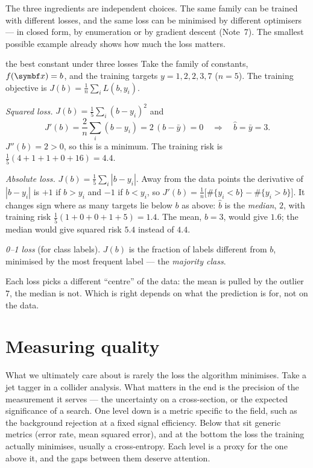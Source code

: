 \documentclass[11pt]{article}
\begin{document}
The three ingredients are independent choices. The same family can be trained with different losses, and the same
loss can be minimised by different optimisers --- in closed form, by enumeration or by gradient descent (Note~7).
The smallest possible example already shows how much the loss matters.

\begin{worked}{the best constant under three losses}
Take the family of constants, $f(\x) = b$, and the training targets $y = 1, 2, 2, 3, 7$ ($n = 5$). The training
objective is $J(b) = \frac1n \sum_i L(b, y_i)$.

\emph{Squared loss.} $J(b) = \frac15 \sum_i (b - y_i)^2$ and
\[
  J'(b) = \frac{2}{n} \sum_i (b - y_i) = 2\,(b - \bar y) = 0 \quad\Longrightarrow\quad \hat b = \bar y = 3 .
\]
$J''(b) = 2 > 0$, so this is a minimum. The training risk is
$\frac15(4 + 1 + 1 + 0 + 16) = 4.4$.

\emph{Absolute loss.} $J(b) = \frac15 \sum_i |b - y_i|$. Away from the data points the derivative of $|b - y_i|$ is
$+1$ if $b > y_i$ and $-1$ if $b < y_i$, so
$J'(b) = \frac1n\big[\#\{y_i < b\} - \#\{y_i > b\}\big]$. It changes sign where as many targets lie below $b$ as
above: $\hat b$ is the \emph{median}, $2$, with training risk $\frac15(1 + 0 + 0 + 1 + 5) = 1.4$. The mean, $b = 3$,
would give $1.6$; the median would give squared risk $5.4$ instead of $4.4$.

\emph{0--1 loss} (for class labels). $J(b)$ is the fraction of labels different from $b$, minimised by the most
frequent label --- the \emph{majority class}.

Each loss picks a different ``centre'' of the data: the mean is pulled by the outlier $7$, the median is not.
Which is right depends on what the prediction is for, not on the data.
\end{worked}

\section{Measuring quality}\label{sec:quality}

What we ultimately care about is rarely the loss the algorithm minimises. Take a jet tagger in a collider analysis.
What matters in the end is the precision of the measurement it serves --- the uncertainty on a cross-section, or the
expected significance of a search. One level down is a metric specific to the field, such as the background rejection
at a fixed signal efficiency. Below that sit generic metrics (error rate, mean squared error), and at the bottom the
loss the training actually minimises, usually a cross-entropy. Each level is a proxy for the one above it, and the
gaps between them deserve attention.
\end{document}
